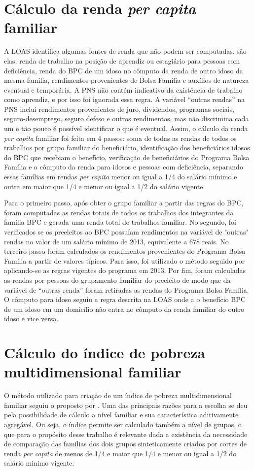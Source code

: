 \documentclass[
	12pt,				%
	openright,			%
	twoside,			%
	a4paper,			%
	english,			%
	french,				%
	spanish,			%
	brazil				%
	]{abntex2}
\begin{document}
	\section{Cálculo da renda \textit{per capita} familiar}
    A LOAS identifica algumas fontes de renda que não podem ser computadas, são elas: renda de trabalho na posição de aprendiz ou estagiário para pessoas com deficiência, renda do BPC de um idoso no cômputo da renda de outro idoso da mesma família, rendimentos provenientes de Bolsa Família e auxílios de natureza eventual e temporária. A PNS não contém indicativo da existência de trabalho como aprendiz, e por isso foi ignorada essa regra. A variável ``outras rendas'' na PNS inclui rendimentos provenientes de juro, dividendos, programas sociais, seguro-desemprego, seguro defeso e outros rendimentos, mas não discrimina cada um e tão pouco é possível identificar o que é eventual. Assim, o cálculo da renda \textit{per capita} familiar foi feita em 4 passos: soma de todas as rendas de todos os trabalhos por grupo familiar do beneficiário, identificação dos beneficiários idosos do BPC que recebiam o benefício, verificação de beneficiários do Programa Bolsa Família e o cômputo da renda para idosos e pessoas com deficiência, separando essas famílias em rendas \textit{per capita} menor ou igual a 1/4 do salário mínimo e outra em maior que 1/4 e menor ou igual a 1/2 do salário vigente. 
      
	Para o primeiro passo, após obter o grupo familiar a partir das regras do BPC, foram computadas as rendas totais de todos os trabalhos dos integrantes da família BPC e gerada uma renda total de trabalhos familiar. No segundo, foi verificados se os preeleitos ao BPC possuíam rendimentos na variável de "outras" rendas no valor de um salário mínimo de 2013, equivalente a 678 reais. No terceiro passo foram calculados os rendimentos provenientes do Programa Bolsa Família a partir de valores típicos. Para isso, foi utilizado o método seguido por \cite{metodologiaOsorio2011} aplicando-se as regras vigentes do programa em 2013. Por fim, foram calculadas as rendas por pessoas do grupamento familiar do preeleito de modo que da variável de ``outras renda'' foram retiradas as rendas do Programa Bolsa Família. O cômputo para idoso seguiu a regra descrita na LOAS onde a o benefício BPC de um idoso em um domicílio não entra no cômputo da renda familiar do outro idoso e vice versa.
	
	
	\section{Cálculo do índice de pobreza multidimensional familiar}
	O método utilizado para criação de um índice de pobreza multidimensional familiar seguiu o proposto por . Uma das principais razões para a escolha se deu pela possibilidade de cálculo a nível familiar e sua característica aditivamente agregável. Ou seja, o índice permite ser calculado também a nível de grupos, o que para o propósito desse trabalho é relevante dada a existência da necessidade de comparação das famílias dos dois grupos sinteticamente criados por cortes de renda \textit{per capita} de menos de 1/4 e maior que 1/4 e menor ou igual a 1/2 do salário minimo vigente.
	
\end{document}
